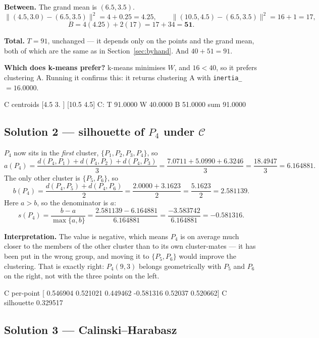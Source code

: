 \documentclass[11pt]{article}
\begin{document}
\textbf{Between.} The grand mean is $(6.5, 3.5)$.
\[
  \lVert (4.5,3.0)-(6.5,3.5)\rVert^2 = 4 + 0.25 = 4.25,
  \qquad
  \lVert (10.5,4.5)-(6.5,3.5)\rVert^2 = 16 + 1 = 17,
\]
\[
  B = 4(4.25) + 2(17) = 17 + 34 = \mathbf{51}.
\]

\textbf{Total.} $T = 91$, unchanged --- it depends only on the points and the
grand mean, both of which are the same as in Section~\ref{sec:byhand}. And
$40 + 51 = 91$. \checkmark

\textbf{Which does k-means prefer?} k-means minimises $W$, and
$16 < 40$, so it prefers clustering A. Running it confirms this: it returns
clustering A with \texttt{inertia\_} $= 16.0000$.

\begin{codeout}
C centroids [4.5 3. ] [10.5  4.5]
C: T 91.0000 W 40.0000 B 51.0000  sum 91.0000
\end{codeout}

\subsection*{Solution 2 --- silhouette of $P_4$ under $\mathcal{C}$}

$P_4$ now sits in the \emph{first} cluster, $\{P_1,P_2,P_3,P_4\}$, so
\[
  a(P_4) = \frac{d(P_4,P_1) + d(P_4,P_2) + d(P_4,P_3)}{3}
         = \frac{7.0711 + 5.0990 + 6.3246}{3}
         = \frac{18.4947}{3} = 6.164881 .
\]
The only other cluster is $\{P_5,P_6\}$, so
\[
  b(P_4) = \frac{d(P_4,P_5) + d(P_4,P_6)}{2}
         = \frac{2.0000 + 3.1623}{2} = \frac{5.1623}{2} = 2.581139 .
\]
Here $a > b$, so the denominator is $a$:
\[
  s(P_4) = \frac{b - a}{\max\{a,b\}} = \frac{2.581139 - 6.164881}{6.164881}
         = \frac{-3.583742}{6.164881} = \mathbf{-0.581316}.
\]

\textbf{Interpretation.} The value is negative, which means $P_4$ is on
average much closer to the members of the other cluster than to its own
cluster-mates --- it has been put in the wrong group, and moving it to
$\{P_5,P_6\}$ would improve the clustering. That is exactly right: $P_4(9,3)$
belongs geometrically with $P_5$ and $P_6$ on the right, not with the three
points on the left.

\begin{codeout}
C per-point [ 0.546904  0.521021  0.449462 -0.581316  0.52037   0.520662]
C silhouette 0.329517
\end{codeout}

\subsection*{Solution 3 --- Calinski--Harabasz}
\end{document}
